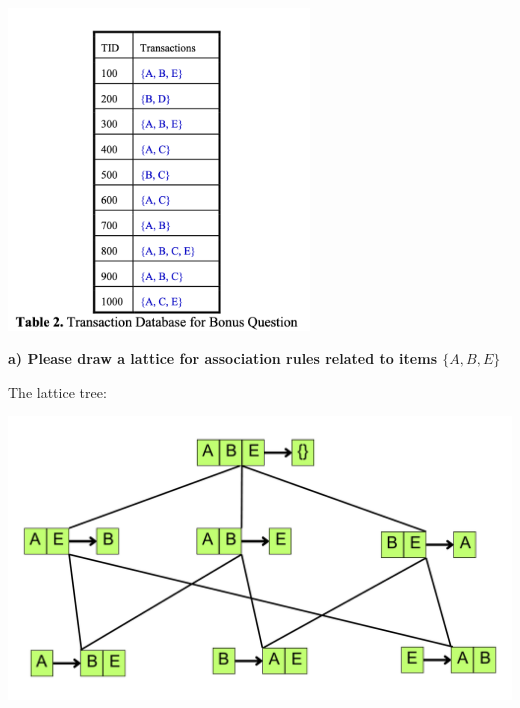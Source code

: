 \documentclass[12pt,letterpaper, onecolumn]{exam}
\begin{document}
\begin{questions}
    \question [] \droppoints
    
    \includegraphics[width=0.6\textwidth]{figure/P4.png}
    \begin{solution}
        \textbf{a) Please draw a lattice for association rules related to items $\{A, B, E\}$}
        
        The lattice tree:

        \includegraphics[width=\textwidth]{figure/Latic.pdf}
    \end{solution}




\end{questions}   
\end{document}
